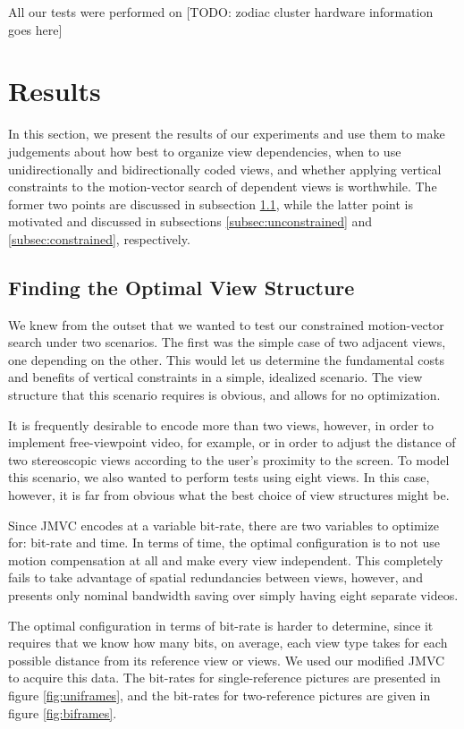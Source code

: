 \documentclass[twoside, 11pt]{article}
\begin{document}
All our tests were performed on [TODO: zodiac cluster hardware information goes
here]

\section{Results} %
\label{sec:results} %
In this section, we present the results of our experiments and use them to make
judgements about how best to organize view dependencies, when to use
unidirectionally and bidirectionally coded views, and whether applying vertical
constraints to the motion-vector search of dependent views is worthwhile. The
former two points are discussed in subsection \ref{subsec:optimal}, while the
latter point is motivated and discussed in subsections
\ref{subsec:unconstrained} and \ref{subsec:constrained}, respectively.

\subsection{Finding the Optimal View Structure}
\label{subsec:optimal}
We knew from the outset that we wanted to test our constrained motion-vector
search under two scenarios. The first was the simple case of two adjacent views,
one depending on the other. This would let us determine the fundamental costs
and benefits of vertical constraints in a simple, idealized scenario. The view
structure that this scenario requires is obvious, and allows for no
optimization.

It is frequently desirable to encode more than two views, however, in order to
implement free-viewpoint video, for example, or in order to adjust the distance
of two stereoscopic views according to the user's proximity to the screen. To
model this scenario, we also wanted to perform tests using eight views. In this
case, however, it is far from obvious what the best choice of view structures
might be.

Since JMVC encodes at a variable bit-rate, there are two variables to optimize
for: bit-rate and time. In terms of time, the optimal configuration is to not
use motion compensation at all and make every view independent. This completely
fails to take advantage of spatial redundancies between views, however, and
presents only nominal bandwidth saving over simply having eight separate videos.

The optimal configuration in terms of bit-rate is harder to determine, since it
requires that we know how many bits, on average, each view type takes for each
possible distance from its reference view or views. We used our modified JMVC to
acquire this data. The bit-rates for single-reference pictures are presented in
figure \ref{fig:uniframes}, and the bit-rates for two-reference pictures are
given in figure \ref{fig:biframes}.
\end{document}
